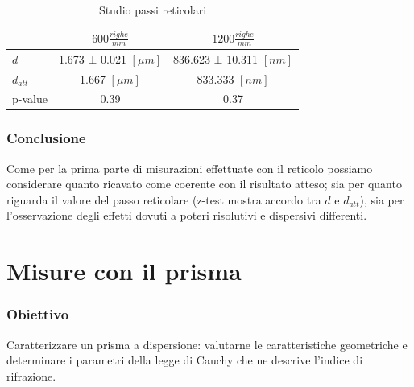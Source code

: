 \documentclass[a4paper]{article}
\begin{document}
\begin{table}[htbp]
\centering
\begin{tabular}{|l|c|c|}
\hline
 & $600 \frac{righe}{mm}$ & $1200 \frac{righe}{mm}$ \\\hline
$d$ & 1.673 ± 0.021 $[\mu m]$ & 836.623 ± 10.311 $[nm]$\\\hline
$d_{att} $ & 1.667 $[\mu m]$ & 833.333 $[nm]$\\\hline
p-value &  0.39 & 0.37 \\\hline
\end{tabular}
\caption{Studio passi reticolari}
\label{tab:passi+test_compatibilità}
\end{table}

\subsubsection{Conclusione}
Come per la prima parte di misurazioni effettuate con il reticolo possiamo considerare quanto ricavato come coerente con il risultato atteso; sia per quanto riguarda il valore del passo reticolare (z-test mostra accordo tra $d$ e $d_{att}$), sia per l'osservazione degli effetti dovuti a poteri risolutivi e dispersivi differenti.




\section{Misure con il prisma}
\subsubsection{Obiettivo}
Caratterizzare un prisma a dispersione: valutarne le caratteristiche geometriche e determinare i parametri della legge di Cauchy che ne descrive l'indice di rifrazione.
\end{document}
